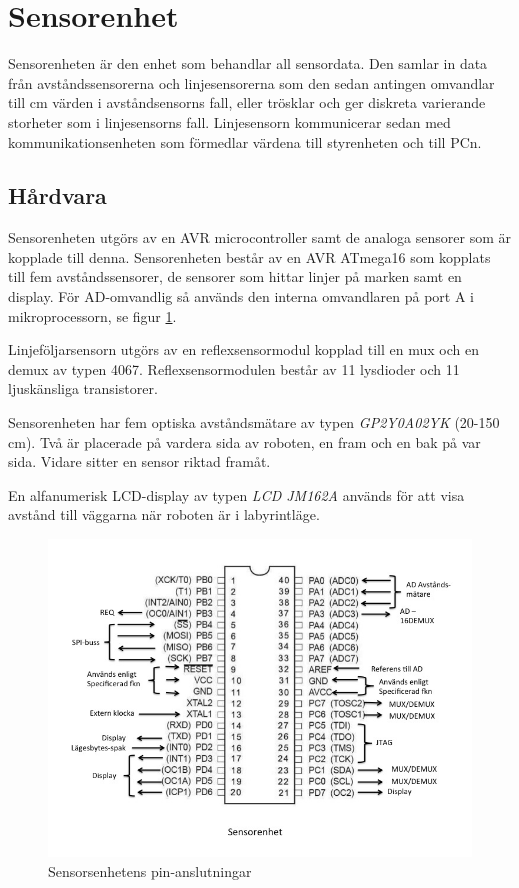 
\section{Sensorenhet}

Sensorenheten är den enhet som behandlar all sensordata. Den samlar in data från 
avståndssensorerna och linjesensorerna som den sedan antingen omvandlar till 
cm värden i avståndsensorns fall, eller trösklar och ger diskreta varierande storheter 
som i linjesensorns fall. Linjesensorn kommunicerar sedan med kommunikationsenheten
som förmedlar värdena till styrenheten och till PCn.

\subsection{Hårdvara}
Sensorenheten utgörs av en AVR microcontroller samt de analoga sensorer som är kopplade till denna. Sensorenheten består av en AVR ATmega16 som 
kopplats till fem avståndssensorer, de sensorer som hittar linjer på marken samt en display. För AD-omvandlig så används den interna omvandlaren på port A
i mikroprocessorn, se figur \ref{fig:PINsensor}. 

Linjeföljarsensorn utgörs av en reflexsensormodul kopplad till en mux och en demux av typen 4067. Reflexsensormodulen består av 11 lysdioder och 11 ljuskänsliga transistorer. 

Sensorenheten har fem optiska avståndsmätare av typen \emph{GP2Y0A02YK} (20-150 cm). Två är placerade på vardera sida av roboten, en fram och en bak på var sida. Vidare sitter en sensor riktad framåt. 

En alfanumerisk LCD-display av typen \emph{LCD JM162A} används för att visa avstånd till väggarna när roboten är i labyrintläge. 


\begin{figure}[H]
  \centering
 \includegraphics[angle=0,scale=0.5]{bilder/PIN_sensor.jpg}
  \caption{Sensorsenhetens pin-anslutningar}
  \label{fig:PINsensor}
\end{figure}

